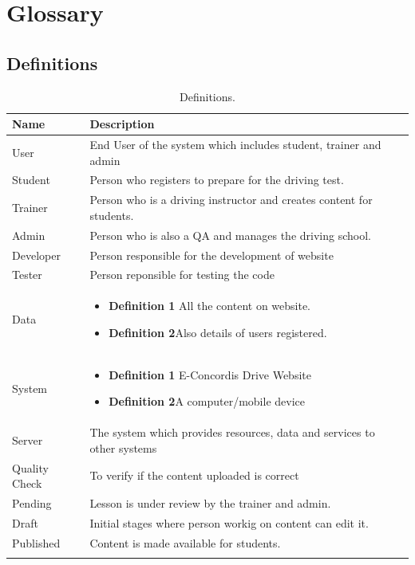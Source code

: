 \documentclass{report}
\begin{document}
\section{ Glossary}
\label{sec:Glossary}
\subsection{Definitions}
\begin{longtable}{|p{4.5cm}|p{6.5cm}|}\hline
    \textbf{Name} & \textbf{Description}  \\ \hline
         User& End User of the system which includes student, trainer and admin\\ \hline
         Student& Person who registers to prepare for the driving test.\\ \hline
         Trainer& Person who is a driving instructor and creates content for students.\\ \hline
         Admin& Person who is also a QA and manages the driving school.\\ \hline
         Developer& Person responsible for the development of website\\ \hline
         Tester& Person reponsible for testing the code\\ \hline
         Data& \begin{itemize}
             \item \textbf{Definition 1} All the content on website.
             \item \textbf{Definition 2}Also details of users registered.
         \end{itemize}\\ \hline
         System& \begin{itemize}
             \item \textbf{Definition 1} E-Concordis Drive Website
             \item \textbf{Definition 2}A computer/mobile device
         \end{itemize}\\ \hline
         Server& The system which provides resources, data and services to other systems\\ \hline
         Quality Check & To verify if the content uploaded is correct\\ \hline
         Pending& Lesson is under review by the trainer and admin.\\ \hline
         Draft& Initial stages where person workig on content can edit it.\\ \hline
         Published& Content is made available for students.\\ \hline
         \caption{Definitions.\label{long}}\\
\end{longtable}
\end{document}
